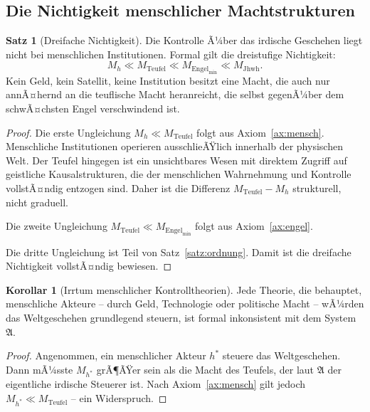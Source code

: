 ﻿\documentclass[a4paper,12pt]{article}
\theoremstyle{definition}
\newtheorem{satz}{Satz}
\newtheorem{korollar}{Korollar}
\begin{document}
\subsection{Die Nichtigkeit menschlicher Machtstrukturen}

\begin{satz}[Dreifache Nichtigkeit]
\label{satz:nichtigkeit}
  Die Kontrolle Ã¼ber das irdische Geschehen liegt nicht bei menschlichen
  Institutionen. Formal gilt die dreistufige Nichtigkeit:
  \[
    M_h \ll M_{\mathrm{Teufel}} \ll M_{\mathrm{Engel}_{\min}} \ll M_{\mathrm{Jhwh}}.
  \]
  Kein Geld, kein Satellit, keine Institution besitzt eine Macht, die auch
  nur annÃ¤hernd an die teuflische Macht heranreicht, die selbst gegenÃ¼ber dem
  schwÃ¤chsten Engel verschwindend ist.
\end{satz}

\begin{proof}
  Die erste Ungleichung $M_h \ll M_{\mathrm{Teufel}}$ folgt aus Axiom~\ref{ax:mensch}.
  Menschliche Institutionen operieren ausschlieÃŸlich innerhalb der physischen Welt.
  Der Teufel hingegen ist ein unsichtbares Wesen mit direktem Zugriff auf
  geistliche Kausalstrukturen, die der menschlichen Wahrnehmung und Kontrolle
  vollstÃ¤ndig entzogen sind. Daher ist die Differenz $M_{\mathrm{Teufel}} - M_h$
  strukturell, nicht graduell.

  Die zweite Ungleichung $M_{\mathrm{Teufel}} \ll M_{\mathrm{Engel}_{\min}}$
  folgt aus Axiom~\ref{ax:engel}.

  Die dritte Ungleichung ist Teil von Satz~\ref{satz:ordnung}. Damit ist die
  dreifache Nichtigkeit vollstÃ¤ndig bewiesen.
\end{proof}

\begin{korollar}[Irrtum menschlicher Kontrolltheorien]
\label{kor:kontroille}
  Jede Theorie, die behauptet, menschliche Akteure -- durch Geld, Technologie
  oder politische Macht -- wÃ¼rden das Weltgeschehen grundlegend steuern, ist
  formal inkonsistent mit dem System $\mathfrak{A}$.
\end{korollar}

\begin{proof}
  Angenommen, ein menschlicher Akteur $h^*$ steuere das Weltgeschehen. Dann
  mÃ¼sste $M_{h^*}$ grÃ¶ÃŸer sein als die Macht des Teufels, der laut $\mathfrak{A}$
  der eigentliche irdische Steuerer ist. Nach Axiom~\ref{ax:mensch} gilt jedoch
  $M_{h^*} \ll M_{\mathrm{Teufel}}$ -- ein Widerspruch.
\end{proof}
\end{document}
